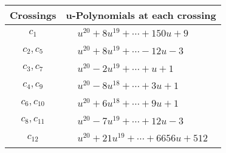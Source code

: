 \documentclass[1p]{elsarticle_modified}
\theoremstyle{definition}
\begin{document}
\begin{tabular}{m{50pt}|m{274pt}}
Crossings & \hspace{64pt}u-Polynomials at each crossing \\
\hline $$\begin{aligned}c_{1}\end{aligned}$$&$\begin{aligned}
&u^{20}+8 u^{19}+\cdots+150 u+9
\end{aligned}$\\
\hline $$\begin{aligned}c_{2},c_{5}\end{aligned}$$&$\begin{aligned}
&u^{20}+8 u^{19}+\cdots-12 u-3
\end{aligned}$\\
\hline $$\begin{aligned}c_{3},c_{7}\end{aligned}$$&$\begin{aligned}
&u^{20}-2 u^{19}+\cdots+u+1
\end{aligned}$\\
\hline $$\begin{aligned}c_{4},c_{9}\end{aligned}$$&$\begin{aligned}
&u^{20}-8 u^{18}+\cdots+3 u+1
\end{aligned}$\\
\hline $$\begin{aligned}c_{6},c_{10}\end{aligned}$$&$\begin{aligned}
&u^{20}+6 u^{18}+\cdots+9 u+1
\end{aligned}$\\
\hline $$\begin{aligned}c_{8},c_{11}\end{aligned}$$&$\begin{aligned}
&u^{20}-7 u^{19}+\cdots+12 u-3
\end{aligned}$\\
\hline $$\begin{aligned}c_{12}\end{aligned}$$&$\begin{aligned}
&u^{20}+21 u^{19}+\cdots+6656 u+512
\end{aligned}$\\
\hline
\end{tabular}\\~\\
\newpage\renewcommand{\arraystretch}{1}
\end{document}
